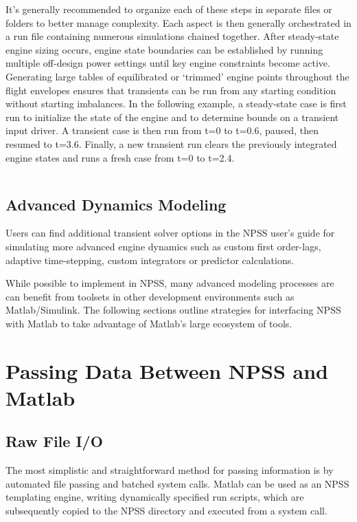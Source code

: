 \documentclass[heading.tex]{subfiles}
\begin{document}
It's generally recommended to organize each of these steps in separate files or folders to better manage complexity.
Each aspect is then generally orchestrated in a run file containing numerous simulations chained together. 
After steady-state engine sizing occurs, engine state boundaries can be established by running multiple
off-design power settings until key engine constraints become active. Generating large tables of equilibrated or `trimmed' engine points
throughout the flight envelopes ensures that transients can be run from any starting condition without
starting imbalances.
In the following example, a steady-state case is first run to initialize the state of the engine and
to determine bounds on a transient input driver.
A transient case is then run from t=0 to t=0.6, paused, then resumed to t=3.6.
Finally, a new transient run clears the previously integrated engine states and runs a fresh case from t=0 to t=2.4.

 \begin{adjustwidth}{1cm}{-1cm}
 \inputminted[]{c++}{code/transientRun}
 \end{adjustwidth} 

\subsection{Advanced Dynamics Modeling}

Users can find additional transient solver options in the NPSS user's guide \cite[chap.~18]{NPSS} for simulating
more advanced engine dynamics such as custom first order-lags, adaptive time-stepping, custom integrators or
predictor calculations.

While possible to implement in NPSS, many advanced modeling processes are can benefit
from toolsets in other development environments such as Matlab/Simulink.
The following sections outline strategies for interfacing NPSS with Matlab to take advantage of Matlab's large
ecosystem of tools.

\section{Passing Data Between NPSS and Matlab}
\subsection{Raw File I/O}

The most simplistic and straightforward method for passing information is by automated file passing and batched system calls.
Matlab can be used as an NPSS templating engine, writing dynamically specified run scripts, which are subsequently
copied to the NPSS directory and executed from a system call.
\end{document}

